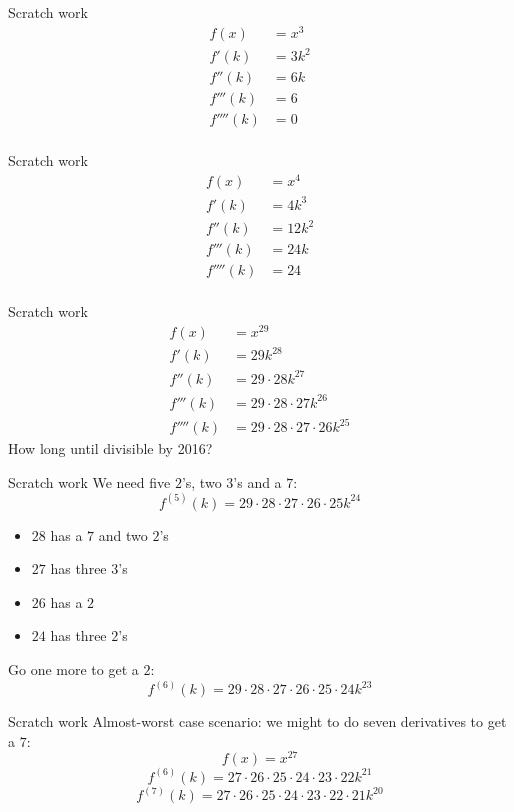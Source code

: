\documentclass{beamer}
\begin{document}
\begin{frame}{Scratch work}
\begin{align*}
f(x) &= x^3\\
f'(k) &= 3k^2\\
f''(k) &= 6k\\
f'''(k) &= 6\\
f''''(k) &= 0\\
\end{align*}
\end{frame}

\begin{frame}{Scratch work}
\begin{align*}
f(x) &= x^4\\
f'(k) &= 4k^3\\
f''(k) &= 12k^2\\
f'''(k) &= 24k\\
f''''(k) &= 24\\
\end{align*}
\end{frame}

\begin{frame}{Scratch work}
\begin{align*}
f(x) &= x^{29}\\
f'(k) &= 29k^{28}\\
f''(k) &= 29\cdot 28k^{27}\\
f'''(k) &= 29\cdot 28\cdot 27 k^{26}\\
f''''(k) &= 29\cdot 28\cdot 27\cdot 26 k^{25}
\end{align*}
How long until divisible by 2016?
\end{frame}

\begin{frame}{Scratch work}
We need five $2$'s, two $3$'s and a $7$:
$$f^{(5)}(k) = 29\cdot 28\cdot 27\cdot 26\cdot 25 k^{24}$$
\pause
\begin{itemize}
\pause
\item $28$ has a $7$ and two $2$'s
\pause
\item $27$ has three $3$'s
\pause
\item $26$ has a $2$
\pause
\item $24$ has three $2$'s
\end{itemize}
\pause
Go one more to get a $2$:
$$f^{(6)}(k) = 29\cdot 28\cdot 27\cdot 26\cdot 25\cdot 24 k^{23}$$
\end{frame}

\begin{frame}{Scratch work}
Almost-worst case scenario: we might to do seven derivatives to get a $7$:
\pause
$$f(x) = x^{27}$$
\pause
$$f^{(6)}(k) = 27\cdot 26\cdot 25\cdot 24\cdot 23\cdot 22 k^{21}$$
\pause
$$f^{(7)}(k) = 27\cdot 26\cdot 25\cdot 24\cdot 23\cdot 22\cdot 21 k^{20}$$
\end{frame}
\end{document}
